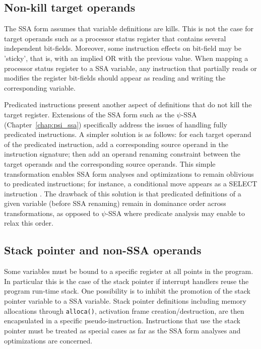 \subsection{Non-kill target operands}

The SSA form assumes that variable definitions are kills. This is not the case
for target operands such as a processor status register that contains several
independent bit-fields. Moreover, some instruction effects on bit-field may be
'sticky', that is, with an implied OR with the previous value. When mapping a
processor status register to a SSA variable, any instruction that partially
reads or modifies the register bit-fields should appear as reading and writing
the corresponding variable.

Predicated instructions present another aspect of definitions that do not kill
the target register. Extensions of the SSA form such as the $\psi$-SSA
(Chapter~\ref{chap:psi_ssa}) specifically address the issues of handling fully
predicated instructions. A simpler solution is as follows: for each target
operand of the predicated instruction, add a corresponding source operand in
the instruction signature; then add an operand renaming constraint between the
target operands and the corresponding source operands. This simple
transformation enables SSA form analyses and optimizations to remain oblivious
to predicated instructions; for instance, a conditional move appears as a
SELECT instruction \cite{Mahlke:1995:ISCA}. The drawback of this solution is
that predicated definitions of a given variable (before SSA renaming) remain in
dominance order across transformations, as opposed to $\psi$-SSA where
predicate analysis may enable to relax this order.

\subsection{Stack pointer and non-SSA operands}

Some variables must be bound to a specific register at all points in the
program. In particular this is the case of the stack pointer if interrupt
handlers reuse the program run-time stack. One possibility is to inhibit the
promotion of the stack pointer variable to a SSA variable. Stack pointer
definitions including memory allocations through \verb|alloca()|, activation
frame creation/destruction, are then encapsulated in a specific
pseudo-instruction. Instructions that use the stack pointer must be treated as
special cases as far as the SSA form analyses and optimizations are concerned.

